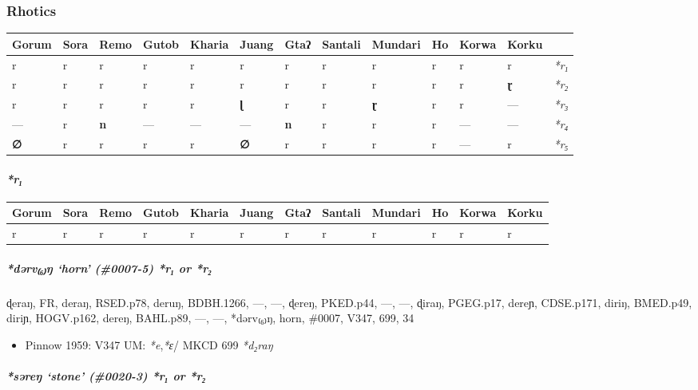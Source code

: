\documentclass[a4paper,]{article}
\providecommand{\tightlist}{%
  \setlength{\itemsep}{0pt}\setlength{\parskip}{0pt}}
\let\oldparagraph\paragraph
\renewcommand{\paragraph}[1]{\oldparagraph{#1}\mbox{}}
\let\oldsubparagraph\subparagraph
\renewcommand{\subparagraph}[1]{\oldsubparagraph{#1}\mbox{}}
\begin{document}
\subsubsection{Rhotics}\label{rhotics}

\begin{longtable}[]{@{}lllllllllllll@{}}
\toprule
Gorum & Sora & Remo & Gutob & Kharia & Juang & Gtaʔ & Santali & Mundari
& Ho & Korwa & Korku &\tabularnewline
\midrule
\endhead
r & r & r & r & r & r & r & r & r & r & r & r &
\emph{*r₁}\tabularnewline
r & r & r & r & r & r & r & r & r & r & r & \textbf{ɽ} &
\emph{*r₂}\tabularnewline
r & r & r & r & r & \textbf{ɭ} & r & r & \textbf{ɽ} & r & r & --- &
\emph{*r₃}\tabularnewline
--- & r & \textbf{n} & --- & --- & --- & \textbf{n} & r & r & r & --- &
--- & \emph{*r₄}\tabularnewline
\textbf{∅} & r & r & r & r & \textbf{∅} & r & r & r & r & --- & r &
\emph{*r₅}\tabularnewline
\bottomrule
\end{longtable}

\paragraph{\texorpdfstring{\emph{*r₁}}{*r₁}}\label{r}

\begin{longtable}[]{@{}llllllllllll@{}}
\toprule
Gorum & Sora & Remo & Gutob & Kharia & Juang & Gtaʔ & Santali & Mundari
& Ho & Korwa & Korku\tabularnewline
\midrule
\endhead
r & r & r & r & r & r & r & r & r & r & r & r\tabularnewline
\bottomrule
\end{longtable}

\subparagraph{\texorpdfstring{\emph{*dərv₍₆₎ŋ} `horn' (\#0007-5)
\emph{*r₁} or
\emph{*r₂}}{*dərv₍₆₎ŋ horn (\#0007-5) *r₁ or *r₂}}\label{dux259rvux14b-horn-0007-5-r-or-r}

ɖeraŋ, FR, deraŋ, RSED.p78, deruŋ, BDBH.1266, ---, ---, ɖereŋ, PKED.p44,
---, ---, ɖiraŋ, PGEG.p17, dereɲ, CDSE.p171, diriŋ, BMED.p49, diriɲ,
HOGV.p162, dereŋ, BAHL.p89, ---, ---, *dərv₍₆₎ŋ, horn, \#0007, V347,
699, 34

\begin{itemize}
\tightlist
\item
  Pinnow 1959: V347 UM: \emph{*e},\emph{*ɛ}/ MKCD 699 \emph{*d₂raŋ}
\end{itemize}

\subparagraph{\texorpdfstring{\emph{*səreŋ} `stone' (\#0020-3)
\emph{*r₁} or
\emph{*r₂}}{*səreŋ stone (\#0020-3) *r₁ or *r₂}}\label{sux259reux14b-stone-0020-3-r-or-r}
\end{document}
